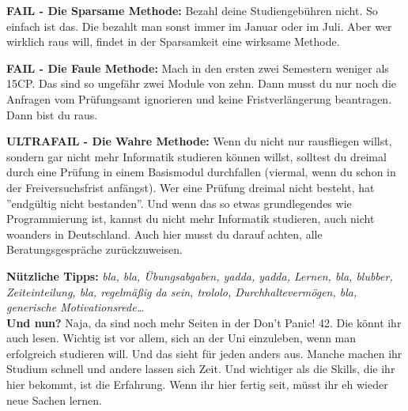 \textbf{FAIL - Die Sparsame Methode:}
Bezahl deine Studiengeb\"uhren nicht. So einfach ist das. Die bezahlt man sonst immer im Januar oder im Juli. Aber wer wirklich raus will, findet in der Sparsamkeit eine wirksame Methode.

\textbf{FAIL - Die Faule Methode:}
Mach in den ersten zwei Semestern weniger als 15CP. Das sind so ungef\"ahr zwei Module von zehn. Dann musst du nur noch die Anfragen vom Pr\"ufungsamt ignorieren und keine Fristverl\"angerung beantragen. Dann bist du raus.

\textbf{ULTRAFAIL - Die Wahre Methode:}
Wenn du nicht nur rausfliegen willst, sondern gar nicht mehr Informatik
studieren k\"onnen willst, solltest du dreimal durch eine Pr\"ufung in einem
Basismodul durchfallen (viermal, wenn du schon in der Freiversuchsfrist
anf\"angst). Wer eine Pr\"ufung dreimal nicht besteht, hat ''endg\"ultig nicht
bestanden''. Und wenn das so etwas grundlegendes wie Programmierung ist, kannst
du nicht mehr Informatik studieren, auch nicht woanders in Deutschland. Auch
hier musst du darauf achten, alle Beratungsgespr\"ache zur\"uckzuweisen.

\textbf{N\"utzliche Tipps:}
\emph{bla, bla, \"Ubungsabgaben, yadda, yadda, Lernen, bla, blubber, Zeiteinteilung, bla, regelm\"a{\ss}ig da sein, trololo, Durchhalteverm\"ogen, bla, generische Motivationsrede\dots}\\

\textbf{Und nun?}
Naja, da sind noch mehr Seiten in der Don't Panic! 42. Die k\"onnt ihr auch
lesen. Wichtig ist vor allem, sich an der Uni einzuleben, wenn man erfolgreich
studieren will. Und das sieht f\"ur jeden anders aus. Manche machen ihr Studium
schnell und andere lassen sich Zeit. Und wichtiger als die Skills, die ihr hier
bekommt, ist die Erfahrung. Wenn ihr hier fertig seit, m\"usst ihr eh wieder
neue Sachen lernen.





